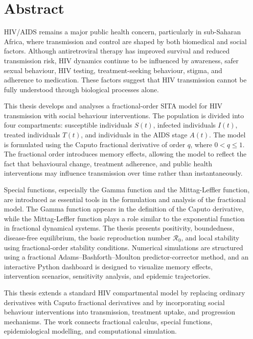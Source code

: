 \documentclass[12pt,a4paper,oneside]{report}
\newcommand{\Rzero}{\mathcal{R}_0}
\begin{document}
\chapter*{Abstract}
HIV/AIDS remains a major public health concern, particularly in sub-Saharan Africa, where transmission and control are shaped by both biomedical and social factors. Although antiretroviral therapy has improved survival and reduced transmission risk, HIV dynamics continue to be influenced by awareness, safer sexual behaviour, HIV testing, treatment-seeking behaviour, stigma, and adherence to medication. These factors suggest that HIV transmission cannot be fully understood through biological processes alone.

This thesis develops and analyses a fractional-order SITA model for HIV transmission with social behaviour interventions. The population is divided into four compartments: susceptible individuals $S(t)$, infected individuals $I(t)$, treated individuals $T(t)$, and individuals in the AIDS stage $A(t)$. The model is formulated using the Caputo fractional derivative of order $q$, where $0<q\leq 1$. The fractional order introduces memory effects, allowing the model to reflect the fact that behavioural change, treatment adherence, and public health interventions may influence transmission over time rather than instantaneously.

Special functions, especially the Gamma function and the Mittag-Leffler function, are introduced as essential tools in the formulation and analysis of the fractional model. The Gamma function appears in the definition of the Caputo derivative, while the Mittag-Leffler function plays a role similar to the exponential function in fractional dynamical systems. The thesis presents positivity, boundedness, disease-free equilibrium, the basic reproduction number $\Rzero$, and local stability using fractional-order stability conditions. Numerical simulations are structured using a fractional Adams--Bashforth--Moulton predictor-corrector method, and an interactive Python dashboard is designed to visualize memory effects, intervention scenarios, sensitivity analysis, and epidemic trajectories.

\begin{remarkbox}[title={Core Contribution}]
This thesis extends a standard HIV compartmental model by replacing ordinary derivatives with Caputo fractional derivatives and by incorporating social behaviour interventions into transmission, treatment uptake, and progression mechanisms. The work connects fractional calculus, special functions, epidemiological modelling, and computational simulation.
\end{remarkbox}
\end{document}
